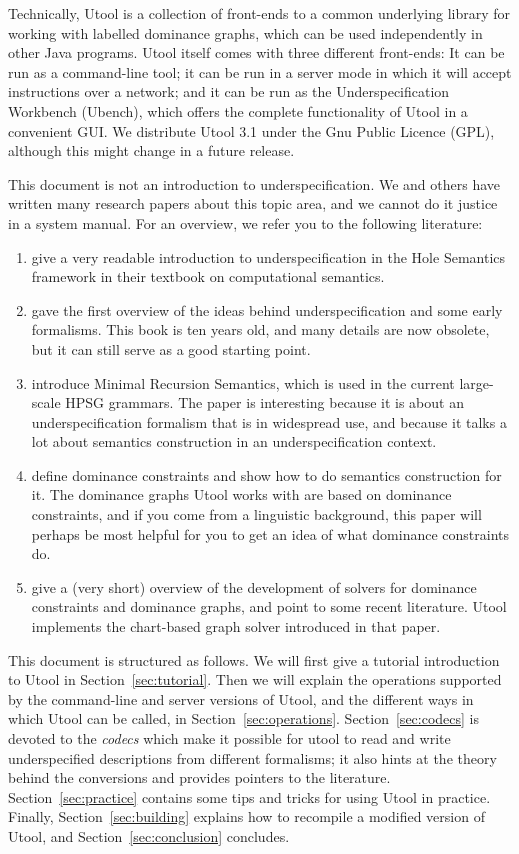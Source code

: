 Technically, Utool is a collection of front-ends to a common
underlying library for working with labelled dominance graphs, which
can be used independently in other Java programs.  Utool itself comes with three different front-ends: It can be run as a command-line tool; it can be run in a server mode in which it will accept instructions over a network; and it can be run as the Underspecification Workbench (Ubench), which offers the complete functionality of Utool in a convenient GUI. We distribute Utool 3.1 under the Gnu Public Licence
(GPL), although this might change in a future release.

This document is not an introduction to underspecification. We and
others have written many research papers about this topic area, and we
cannot do it justice in a system manual. For an overview, we refer you
to the following literature:
\begin{enumerate}
\item {} give a very readable introduction to underspecification in the Hole Semantics framework in their textbook on computational semantics.
\item {} gave the first overview of the ideas
behind underspecification and some early formalisms. This book is ten
years old, and many details are now obsolete, but it can still serve
as a good starting point.
\item {} introduce Minimal Recursion Semantics, which
is used in the current large-scale HPSG grammars. The paper is
interesting because it is about an underspecification formalism that
is in widespread use, and because it talks a lot about semantics
construction in an underspecification context.
\item {} define dominance constraints and show how to do
semantics construction for it. The dominance graphs Utool works with
are based on dominance constraints, and if you come from a linguistic
background, this paper will perhaps be most helpful for you to get an
idea of what dominance constraints do.
\item {} give a (very short) overview of the
development of solvers for dominance constraints and dominance graphs,
and point to some recent literature. Utool implements the chart-based
graph solver introduced in that paper.
\end{enumerate}


This document is structured as follows. We will first give a tutorial
introduction to Utool in Section~\ref{sec:tutorial}. Then we will
explain the operations supported by the command-line and server versions of Utool, and the different ways in
which Utool can be called, in
Section~\ref{sec:operations}. Section~\ref{sec:codecs} is devoted to
the \emph{codecs} which make it possible for utool to read and write
underspecified descriptions from different formalisms; it also hints
at the theory behind the conversions and provides pointers to the
literature. Section~\ref{sec:practice} contains some tips and tricks
for using Utool in practice. Finally, Section~\ref{sec:building}
explains how to recompile a modified version of Utool, and
Section~\ref{sec:conclusion} concludes.

